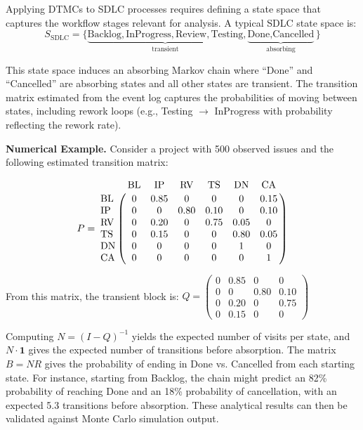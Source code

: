 Applying DTMCs to SDLC processes requires defining a state space that
captures the workflow stages relevant for analysis. A typical SDLC
state space is:
\begin{equation}
\label{eq:sdlc-states}
S_{\text{SDLC}} = \{\underbrace{\text{Backlog}, \text{InProgress},
\text{Review}, \text{Testing}}_{\text{transient}},
\underbrace{\text{Done}, \text{Cancelled}}_{\text{absorbing}}\}
\end{equation}

This state space induces an absorbing Markov chain where ``Done'' and
``Cancelled'' are absorbing states and all other states are transient.
The transition matrix estimated from the event log captures the
probabilities of moving between states, including rework loops (e.g.,
Testing $\rightarrow$ InProgress with probability reflecting the
rework rate).

\textbf{Numerical Example.} Consider a project with 500 observed issues
and the following estimated transition matrix:

\begin{equation}
\label{eq:sdlc-example}
P = \bordermatrix{
  & \text{BL} & \text{IP} & \text{RV} & \text{TS} & \text{DN} & \text{CA} \cr
\text{BL} & 0 & 0.85 & 0 & 0 & 0 & 0.15 \cr
\text{IP} & 0 & 0 & 0.80 & 0.10 & 0 & 0.10 \cr
\text{RV} & 0 & 0.20 & 0 & 0.75 & 0.05 & 0 \cr
\text{TS} & 0 & 0.15 & 0 & 0 & 0.80 & 0.05 \cr
\text{DN} & 0 & 0 & 0 & 0 & 1 & 0 \cr
\text{CA} & 0 & 0 & 0 & 0 & 0 & 1 \cr
}
\end{equation}

From this matrix, the transient block is:
$Q = \begin{pmatrix} 0 & 0.85 & 0 & 0 \\ 0 & 0 & 0.80 & 0.10 \\
0 & 0.20 & 0 & 0.75 \\ 0 & 0.15 & 0 & 0 \end{pmatrix}$

Computing $N = (I - Q)^{-1}$ yields the expected number of visits per
state, and $N \cdot \mathbf{1}$ gives the expected number of transitions
before absorption. The matrix $B = NR$ gives the probability of ending
in Done vs. Cancelled from each starting state. For instance, starting
from Backlog, the chain might predict an 82\% probability of reaching
Done and an 18\% probability of cancellation, with an expected 5.3
transitions before absorption. These analytical results can then be
validated against Monte Carlo simulation output.


